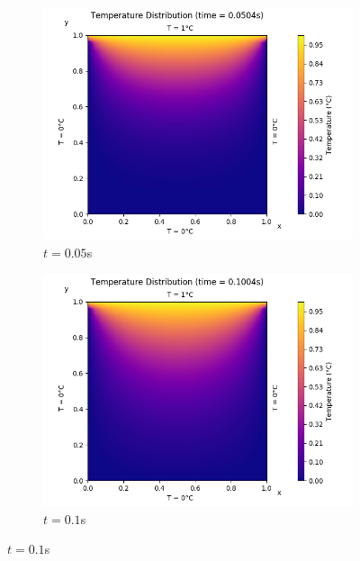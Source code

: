 \documentclass[a4paper]{article}
\begin{document}
\begin{figure}[H]
			\medskip
			\begin{subfigure}{0.48\textwidth}
				\includegraphics[width=\linewidth]{figures/1a_explicit/3)t=50ms.png}
				\caption{$t = 0.05$s}
			\end{subfigure}\hspace*{\fill}
			\begin{subfigure}{0.48\textwidth}
				\includegraphics[width=\linewidth]{figures/1a_explicit/4)t=100ms.png}
				\caption{$t = 0.1$s}
			\end{subfigure}
			

\end{figure}
\end{document}
